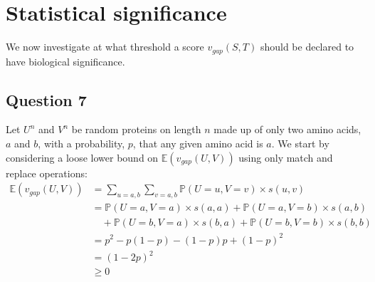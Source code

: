\documentclass[a4paper]{article}
\begin{document}
\section*{Statistical significance}
We now investigate at what threshold a score $v_{gap}(S,T)$ should be declared to have biological significance.

\subsection*{Question 7}
Let $U^n$ and $V^n$ be random proteins on length $n$ made up of only two amino acids, $a$ and $b$, with a probability, $p$, that any given amino acid is $a$. We start by considering a loose lower bound on $\mathbb{E}(v_{gap}(U,V))$ using only match and replace operations:
\begin{align*}
    \mathbb{E}(v_{gap}(U,V)) &= \sum_{u=a,b} \sum_{v=a,b} \mathbb{P}(U=u,V=v) \times s(u,v) \\
                             &= \mathbb{P}(U=a,V=a) \times s(a,a) + \mathbb{P}(U=a,V=b) \times s(a,b) \\
                             &\quad + \mathbb{P}(U=b,V=a) \times s(b,a) + \mathbb{P}(U=b,V=b) \times s(b,b)\\
                             &= p^2 - p(1-p) -(1-p)p + (1-p)^2 \\
                             &= (1-2p)^2 \\
                             &\geq 0
\end{align*}
\end{document}
